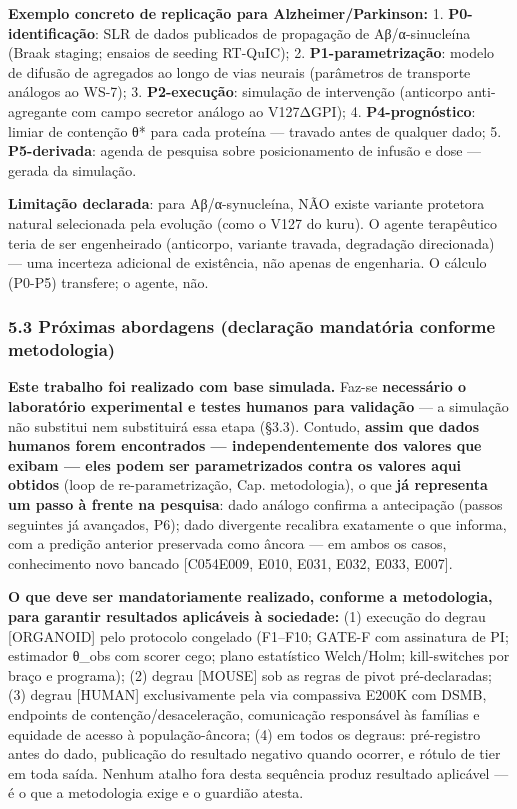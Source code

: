 \documentclass[
  10pt,
]{article}
\begin{document}
\textbf{Exemplo concreto de replicação para Alzheimer/Parkinson:} 1.
\textbf{P0-identificação}: SLR de dados publicados de propagação de
Aβ/α-sinucleína (Braak staging; ensaios de seeding RT-QuIC); 2.
\textbf{P1-parametrização}: modelo de difusão de agregados ao longo de
vias neurais (parâmetros de transporte análogos ao WS-7); 3.
\textbf{P2-execução}: simulação de intervenção (anticorpo anti-agregante
com campo secretor análogo ao V127ΔGPI); 4. \textbf{P4-prognóstico}:
limiar de contenção θ* para cada proteína --- travado antes de qualquer
dado; 5. \textbf{P5-derivada}: agenda de pesquisa sobre posicionamento
de infusão e dose --- gerada da simulação.

\textbf{Limitação declarada}: para Aβ/α-synucleína, NÃO existe variante
protetora natural selecionada pela evolução (como o V127 do kuru). O
agente terapêutico teria de ser engenheirado (anticorpo, variante
travada, degradação direcionada) --- uma incerteza adicional de
existência, não apenas de engenharia. O cálculo (P0-P5) transfere; o
agente, não.

\hypertarget{pruxf3ximas-abordagens-declarauxe7uxe3o-mandatuxf3ria-conforme-metodologia}{%
\subsubsection{5.3 Próximas abordagens (declaração mandatória conforme
metodologia)}\label{pruxf3ximas-abordagens-declarauxe7uxe3o-mandatuxf3ria-conforme-metodologia}}

\textbf{Este trabalho foi realizado com base simulada.} Faz-se
\textbf{necessário o laboratório experimental e testes humanos para
validação} --- a simulação não substitui nem substituirá essa etapa
(§3.3). Contudo, \textbf{assim que dados humanos forem encontrados ---
independentemente dos valores que exibam --- eles podem ser
parametrizados contra os valores aqui obtidos} (loop de
re-parametrização, Cap. metodologia), o que \textbf{já representa um
passo à frente na pesquisa}: dado análogo confirma a antecipação (passos
seguintes já avançados, P6); dado divergente recalibra exatamente o que
informa, com a predição anterior preservada como âncora --- em ambos os
casos, conhecimento novo bancado {[}C054\textbar E009, E010, E031, E032,
E033, E007{]}.

\textbf{O que deve ser mandatoriamente realizado, conforme a
metodologia, para garantir resultados aplicáveis à sociedade:} (1)
execução do degrau {[}ORGANOID{]} pelo protocolo congelado (F1--F10;
GATE-F com assinatura de PI; estimador θ\_obs com scorer cego; plano
estatístico Welch/Holm; kill-switches por braço e programa); (2) degrau
{[}MOUSE{]} sob as regras de pivot pré-declaradas; (3) degrau
{[}HUMAN{]} exclusivamente pela via compassiva E200K com DSMB, endpoints
de contenção/desaceleração, comunicação responsável às famílias e
equidade de acesso à população-âncora; (4) em todos os degraus:
pré-registro antes do dado, publicação do resultado negativo quando
ocorrer, e rótulo de tier em toda saída. Nenhum atalho fora desta
sequência produz resultado aplicável --- é o que a metodologia exige e o
guardião atesta.
\end{document}
